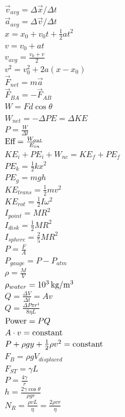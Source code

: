 \documentclass[letterpaper,addpoints,answers]{exam}
\begin{document}
 \fontseries{\seriesdefault}
 \begin{multicols}{2}
 \normalsize
 \noindent
 $\vec{v}_{avg} = \Delta\vec{x} / \Delta t$ \\
 $\vec{a}_{avg} = \Delta\vec{v} / \Delta t$ \\
 $x = x_0 + v_0 t + \frac{1}{2} a t^2$ \\
 $v = v_0 + a t$ \\
 $v_{avg} = \frac{v_0 + v}{2}$ \\
 $v^2 = v_0^2 + 2 a (x - x_0)$ \\
 $\vec{F}_{net} = m \vec{a}$ \\
 $\vec{F}_{BA} = - \vec{F}_{AB}$ \\
 $W = F d \cos\theta$ \\
 $W_{net} = -\Delta PE = \Delta KE$ \\
 $P = \frac{W}{\Delta t}$ \\
 $\hbox{Eff} = \frac{W_{out}}{E_{in}}$ \\
 $KE_i + PE_i + W_{nc} = KE_f + PE_f$ \\
 $PE_k = \frac{1}{2} k x^2$ \\
 $PE_g = m g h$ \\
 $KE_{trans} = \frac{1}{2} m v^2$ \\
 $KE_{rot} = \frac{1}{2} I \omega^2$ \\
 $I_{point} = M R^2$ \\
 $I_{disk} = \frac{1}{2} M R^2$ \\
 $I_{sphere} = \frac{2}{5} M R^2$ \\
 $P = \frac{F}{A}$ \\
 $P_{gauge} = P - P_{atm}$ \\
 $\rho = \frac{M}{V}$ \\
 $\rho_{water} = 10^3\,\hbox{kg}/\hbox{m}^3$ \\
 $Q = \frac{\Delta V}{\Delta t} = A v$ \\
 $Q = \frac{\Delta P \pi r^4}{8 \eta L}$ \\
 $\hbox{Power} = P Q$ \\
 $A \cdot v = \hbox{constant}$ \\
 $P + \rho g y + \frac{1}{2} \rho v^2 = \hbox{constant}$ \\
 $F_B = \rho g V_{displaced}$ \\
 $F_{ST} = \gamma L$ \\
 $P = \frac{4 \gamma}{r}$ \\
 $h = \frac{2 \gamma \cos\theta}{\rho g r}$ \\
 $N_R = \frac{\rho v L}{\eta} = \frac{2 \rho v r}{\eta}$ \\

\end{multicols}
\end{document}
